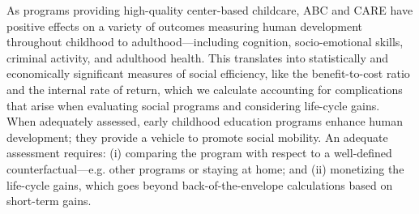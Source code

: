\noindent As programs providing high-quality center-based childcare, ABC and CARE have positive effects on a variety of outcomes measuring human development throughout childhood to adulthood---including cognition, socio-emotional skills, criminal activity, and adulthood health. This translates into statistically and economically significant measures of social efficiency, like the benefit-to-cost ratio and the internal rate of return, which we calculate accounting for complications that arise when evaluating social programs and considering life-cycle gains.\\

\noindent When adequately assessed, early childhood education programs enhance human development; they provide a vehicle to promote social mobility. An adequate assessment requires: (i) comparing the program with respect to a well-defined counterfactual---e.g. other programs or staying at home; and (ii) monetizing the life-cycle gains, which goes beyond back-of-the-envelope calculations based on short-term gains. 

\singlespace



 